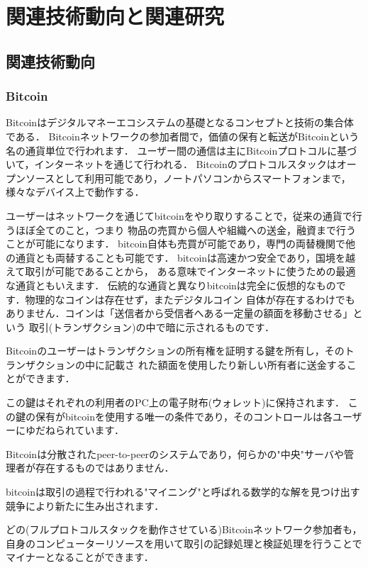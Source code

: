 \documentclass[a4paper,12pt]{jsarticle}
\begin{document}
\newpage
\section{関連技術動向と関連研究}
\subsection{関連技術動向}
\subsubsection{Bitcoin}
Bitcoinはデジタルマネーエコシステムの基礎となるコンセプトと技術の集合体である．
Bitcoinネットワークの参加者間で，価値の保有と転送がBitcoinという名の通貨単位で行われます．
ユーザー間の通信は主にBitcoinプロトコルに基づいて，インターネットを通じて行われる．
Bitcoinのプロトコルスタックはオープンソースとして利用可能であり，ノートパソコンからスマートフォンまで，様々なデバイス上で動作する．

ユーザーはネットワークを通じてbitcoinをやり取りすることで，従来の通貨で行うほぼ全てのこと，つまり
物品の売買から個人や組織への送金，融資まで行うことが可能になります．
bitcoin自体も売買が可能であり，専門の両替機関で他の通貨とも両替することも可能です．
bitcoinは高速かつ安全であり，国境を越えて取引が可能であることから，
ある意味でインターネットに使うための最適な通貨ともいえます．
伝統的な通貨と異なりbitcoinは完全に仮想的なものです．物理的なコインは存在せず，またデジタルコイン
自体が存在するわけでもありません．コインは「送信者から受信者へある一定量の額面を移動させる」という
取引(トランザクション)の中で暗に示されるものです．

Bitcoinのユーザーはトランザクションの所有権を証明する鍵を所有し，そのトランザクションの中に記載さ
れた額面を使用したり新しい所有者に送金することができます．

この鍵はそれぞれの利用者のPC上の電子財布(ウォレット)に保持されます．
この鍵の保有がbitcoinを使用する唯一の条件であり，そのコントロールは各ユーザーにゆだねられています．

Bitcoinは分散されたpeer-to-peerのシステムであり，何らかの"中央"サーバや管理者が存在するものではありません．

bitcoinは取引の過程で行われる"マイニング"と呼ばれる数学的な解を見つけ出す競争により新たに生み出されます．

どの(フルプロトコルスタックを動作させている)Bitcoinネットワーク参加者も，
自身のコンピューターリソースを用いて取引の記録処理と検証処理を行うことでマイナーとなることができます．
\end{document}
